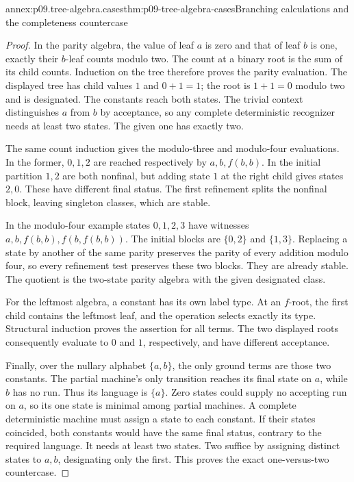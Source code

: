 \begin{annexitem}{annex:p09.tree-algebra.cases}{thm:p09-tree-algebra-cases}{Branching calculations and the completeness countercase}
\begin{proof}
In the parity algebra, the value of leaf \(a\) is zero and that of
leaf \(b\) is one, exactly their \(b\)-leaf counts modulo two.
The count at a binary root is the sum of its child counts.
Induction on the tree therefore proves the parity evaluation.
The displayed tree has child values \(1\) and \(0+1=1\);
the root is \(1+1=0\) modulo two and is designated.
The constants reach both states. The trivial context distinguishes
\(a\) from \(b\) by acceptance, so any complete deterministic
recognizer needs at least two states. The given one has exactly two.

The same count induction gives the modulo-three and modulo-four
evaluations. In the former, \(0,1,2\) are reached respectively by
\(a,b,f(b,b)\). In the initial partition \(1,2\) are both nonfinal,
but adding state \(1\) at the right child gives states \(2,0\).
These have different final status. The first refinement splits
the nonfinal block, leaving singleton classes, which are stable.

In the modulo-four example states \(0,1,2,3\) have witnesses
\(a,b,f(b,b),f(b,f(b,b))\).
The initial blocks are \(\{0,2\}\) and \(\{1,3\}\).
Replacing a state by another of the same parity preserves the parity
of every addition modulo four, so every refinement test preserves
these two blocks. They are already stable. The quotient is the
two-state parity algebra with the given designated class.

For the leftmost algebra, a constant has its own label type.
At an \(f\)-root, the first child contains the leftmost leaf, and
the operation selects exactly its type. Structural induction proves
the assertion for all terms. The two displayed roots consequently
evaluate to \(0\) and \(1\), respectively, and have different acceptance.

Finally, over the nullary alphabet \(\{a,b\}\), the only ground terms
are those two constants. The partial machine's only transition reaches
its final state on \(a\), while \(b\) has no run. Thus its language
is \(\{a\}\). Zero states could supply no accepting run on \(a\),
so its one state is minimal among partial machines.
A complete deterministic machine must assign a state to each constant.
If their states coincided, both constants would have the same final
status, contrary to the required language. It needs at least two states.
Two suffice by assigning distinct states to \(a,b\), designating only
the first. This proves the exact one-versus-two countercase.
\end{proof}
\end{annexitem}

